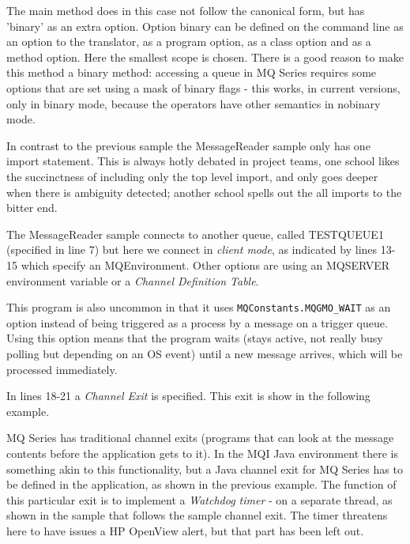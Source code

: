 The main method does in this case not follow the canonical form, but
has 'binary' as an extra option. Option binary can be defined on the
command line as an option to the translator, as a program option, as a
class option and as a method option. Here the smallest scope is
chosen. There is a good reason to make this method a binary method:
accessing a queue in MQ Series requires some options that are set
using a mask of binary flags - this works, in current \nr{} versions,
only in binary mode, because the operators have other semantics in
nobinary mode.


In contrast to the previous sample the MessageReader sample only has
one import statement. This is always hotly debated in project teams,
one school likes the succinctness of including only the top level
import, and only goes deeper when there is ambiguity detected; another
school spells out the all imports to the bitter end. 

The MessageReader sample connects to another queue, called TESTQUEUE1
(specified in line 7) but here we connect in \emph{client mode}, as
indicated by lines 13-15 which specify an MQEnvironment. Other
options are using an MQSERVER environment variable or a \emph{Channel
Definition Table}.

This program is also uncommon in that it uses
\texttt{MQConstants.MQGMO\_WAIT} as an option instead of being
triggered as a process by a message on a trigger queue. Using this
option means that the program waits (stays active, not really busy polling
but depending on an OS event) until a new
message arrives, which will be processed immediately.

In lines 18-21 a \emph{Channel Exit} is specified. This exit is show
in the following example.

 
MQ Series has traditional channel exits (programs that can look at the
message contents before the application gets to it). In the MQI Java
environment there is something akin to this functionality, but a Java
channel exit for MQ Series has to be defined in the application, as
shown in the previous example. The function of this particular exit is
to implement a \emph{Watchdog timer} - on a separate thread, as shown
in the sample that follows the sample channel exit. The timer
threatens here to have issues a HP OpenView alert, but that part has
been left out.

